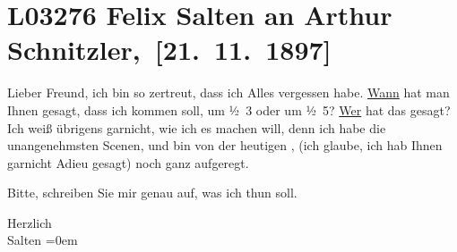 

\section[ Felix Salten an Arthur Schnitzler, {[}21. 11. 1897{]}]{L03276 Felix Salten an Arthur Schnitzler, {[}21. 11. 1897{]}}
\nopagebreak{}
\rehead{ }\normalsize\beginnumbering{}
\toendnotes[C]{\smallbreak\pagebreak[2]}
\toendnotes[C]{\smallbreak}
\pstart
           \noindent{}{\pb}Lieber Freund, ich bin so zertreut, dass ich Alles vergessen habe.
                  \uline{Wann} hat man Ihnen gesagt, dass ich kommen soll,
               um ½ 3 oder um ½ 5? \uline{Wer} hat
               das gesagt? Ich weiß übrigens garnicht, wie ich es machen will, denn ich habe die
               unangenehmsten {\pb}Scenen, und bin
               von der heutigen \label{K_L03276-1v}\label{K_L03276-1}, (ich glaube, ich hab Ihnen garnicht Adieu gesagt)
               noch ganz aufgeregt.\pend
           
\pstart
           Bitte, schreiben Sie mir genau auf, was ich thun soll.\pend
           
\pstart
           Herzlich {\\[\baselineskip]}\spacefill\mbox{Salten}\pend
           \leftskip=0em{}\endnumbering{}  
      